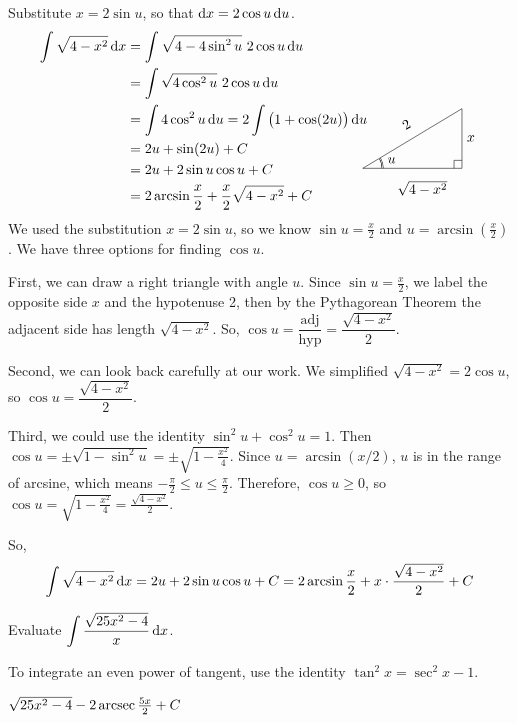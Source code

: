 \begin{solution}
Substitute $x=2\sin u$, so that $\mathrm{d}x=2 \cos u\,\mathrm{d}u$.
\begin{align*}
\int \sqrt{4-x^2}\,\dee{x}
&=\int \sqrt{4-4\sin^2u}\ 2\cos u\,\dee{u}   \\
&=\int \sqrt{4\cos^2u}\ 2\cos u\,\dee{u}   \\
&=\int 4\cos^2 u\,\dee{u}
=2\int \big(1+\cos(2u)\big)\,\dee{u} \\
&= 2u +\sin(2u) + C \\
&=2u + 2\sin u\cos u + C \\
&=2\arcsin\frac{x}{2} + \frac{ x}{2}\sqrt{4-x^2} + C
\hskip0.5in\smash{
\trigtri{u}{\sqrt{4-x^2}}{x}{2}}
\end{align*}
We used the substitution $x = 2\sin u$, so we know $\sin u = \frac{x}{2}$ and $u=\arcsin(\frac{x}{2})$. We have three options for finding  $\cos u$.

First, we can draw a right triangle with angle $u$. Since $\sin u = \frac{x}{2}$, we label the opposite side $x$ and the hypotenuse 2, then by the Pythagorean Theorem the adjacent side has length $\sqrt{4-x^2}$. So, $\cos u = \dfrac{\mbox{adj}}{\mbox{hyp}} = \dfrac{\sqrt{4-x^2}}{2}$.

Second, we can look back carefully at our work. We simplified $\sqrt{4-x^2} = 2\cos u$, so $\cos u = \dfrac{\sqrt{4-x^2}}{2}$.

Third, we could use the identity $\sin^2 u + \cos^2 u =1$. Then $\cos u = \pm\sqrt{1-\sin^2 u} = \pm\sqrt{1-\frac{x^2}{4}}$. Since $u = \arcsin (x/2)$, $u$ is in the range of arcsine, which means $-\frac{\pi}{2} \leq u \leq \frac{\pi}{2}$. Therefore, $\cos u \geq 0$, so $\cos u = \sqrt{1-\frac{x^2}{4}} = \frac{\sqrt{4-x^2}}{2}$.

So,
\[\int \sqrt{4-x^2}\,\mathrm{d}x=2u + 2\sin u\cos u + C=
2\arcsin\frac{x}{2}+x\cdot\frac{\sqrt{4-x^2}}{2}+C
\]
\end{solution}



\begin{question}[M105 2012A]
Evaluate $\displaystyle\int \frac{\sqrt{25x^2-4}}{x}\,\mathrm{d}x$.
\end{question}

\begin{hint}
To integrate an even power of tangent, use the identity $\tan^2 x = \sec^2 x - 1$.
\end{hint}

\begin{answer}
$\sqrt{25x^2-4}-2\mathop{\mathrm{arcsec}}\frac{5x}{2}  + C$
\end{answer}

